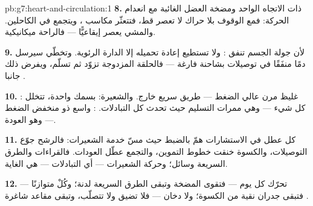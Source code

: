 \begin{solution}{pb:g7:heart-and-circulation:1}
\textbf{8.}   ذات الاتجاه الواحد ومضخة العضل الغائبة
مع انعدام الحركة: فمع الوقوف بلا حراك لا تعصر  قط، فتتعثّر
مكاسب ، ويتجمع  في الكاحلين. والمشي يعصر 
إيقاعيًّا --- فالراحة ميكانيكية.

\textbf{9.} لأن جولة الجسم تنفق  : ولا تستطيع إعادة
تحميله إلا الدارة الرئوية. وتخطّي  سيرسل دمًا منفَقًا في
توصيلات بشاحنة فارغة --- فالحلقة المزدوجة تزوّد ثم تسلّم، ويفرض
ذلك جانبا .

\textbf{10.} : غليظ مرن عالي الضغط --- طريق سريع خارج.
والشعيرة: بسمك  واحدة، تتخلل كل شيء --- وهي ممرات التسليم حيث
تحدث كل التبادلات. : واسع ذو  منخفض الضغط --- وهو
العودة.

\textbf{11.} كل عطل في الاستشارات همّ بالضبط حيث مسّ خدمة
الشعيرات: فالرشح جوّع التوصيلات، والكسوة خنقت خطوط التموين،
والتجمع عطّل العودات. فالقراءات  والطرق السريعة وسائل؛
وحركة الشعيرات --- أي التبادلات --- هي الغاية.

\textbf{12.} تحرّك كل يوم --- فتقوى المضخة وتبقى الطرق السريعة
لدنة؛ وكُلْ متوازنًا --- فتبقى جدران  نقية من الكسوة؛ ولا
دخان --- فلا تضيق  ولا تتصلّب، وتبقى مقاعد  شاغرة
.
\end{solution}

